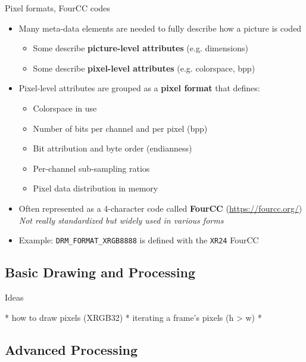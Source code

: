 \begin{frame}[fragile]{Pixel formats, FourCC codes}
  \begin{itemize}
  \item Many meta-data elements are needed to fully describe how a picture is coded
    \begin{itemize}
    \item Some describe \textbf{picture-level attributes} (e.g. dimensions)
    \item Some describe \textbf{pixel-level attributes} (e.g. colorspace, bpp)
    \end{itemize}
  \item Pixel-level attributes are grouped as a \textbf{pixel format} that defines:
    \begin{itemize}
    \item Colorspace in use
    \item Number of bits per channel and per pixel (bpp)
    \item Bit attribution and byte order (endianness)
    \item Per-channel sub-sampling ratios
    \item Pixel data distribution in memory
    \end{itemize}
  \item Often represented as a 4-character code called \textbf{FourCC} {\small(\url{https://fourcc.org/})}\\
  \textit{Not really standardized but widely used in various forms}
  \item Example: \verb,DRM_FORMAT_XRGB8888, is defined with the \verb,XR24, FourCC
  \end{itemize}

\end{frame}

\subsection{Basic Drawing and Processing}

\begin{frame}{Ideas}

* how to draw pixels (XRGB32)
* iterating a frame's pixels (h > w)
* 

\end{frame}

\subsection{Advanced Processing}

